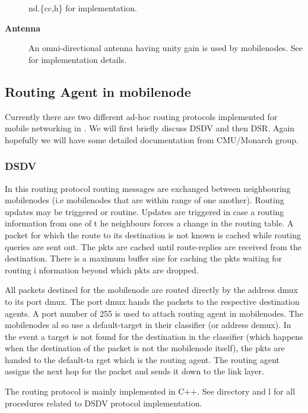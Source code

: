 \begin{description}
{nd.\{cc,h\}} for implementation.

\item[{\bf Antenna}] An omni-directional antenna having unity gain is used by mobilenodes. See  for implementation details.
\end{description}

\subsection{Routing Agent in mobilenode}
\label{sec:mobilenode-routing}

Currently there are two different ad-hoc routing protocols implemented for
mobile networking in \ns. We will first briefly discuss DSDV and then DSR.
Again hopefully we will have some detailed documentation from CMU/Monarch
group. 

\subsubsection{DSDV}
\label{sec:dsdv}

In this routing protocol routing messages are exchanged between
neighbouring mobilenodes (i.e mobilenodes that are within range of one
another). Routing updates may be triggered or routine. Updates are
triggered in case a routing information from one of t   
he neighbours forces a change in the routing table.
A packet for which the route to its destination is not known is cached
while routing queries are sent out. The pkts are cached until
route-replies are received from the destination. There is a maximum buffer
size for caching the pkts waiting for routing i   
nformation beyond which pkts are dropped.

All packets destined for the mobilenode are routed directly by the address
dmux to its port dmux. The port dmux hands the packets to the respective
destination agents. A port number of 255 is used to attach routing agent
in mobilenodes. The mobilenodes al
so use a default-target in their classifier (or address demux). In the
event a target is not found for the destination in the classifier (which
happens when the destination of the packet is not the mobilenode itself),
the pkts are handed to the default-ta   
rget which is the routing agent. The routing agent assigns the next hop
for the packet and sends it down to the link layer. 

The routing protocol is mainly implemented in C++. See 
directory and l for all procedures related to
DSDV protocol implementation.  


